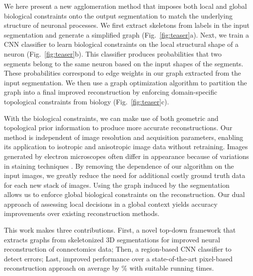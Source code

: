 We here present a new agglomeration method that imposes both local and global biological constraints onto the output segmentation to match the underlying structure of neuronal processes.
We first extract skeletons from labels in the input segmentation and generate a simplified graph (Fig.~\ref{fig:teaser}a). 
Next, we train a CNN classifier to learn biological constraints on the local structural shape of a neuron (Fig.~\ref{fig:teaser}b). 
This classifier produces probabilities that two segments belong to the same neuron based on the input shapes of the segments.
These probabilities correspond to edge weights in our graph extracted from the input segmentation.
We then use a graph optimization algorithm to partition the graph into a final improved reconstruction by enforcing domain-specific topological constraints from biology (Fig.~\ref{fig:teaser}c).

With the biological constraints, we can make use of both geometric and topological prior information to produce more accurate reconstructions.
Our method is independent of image resolution and acquisition parameters, enabling its application to isotropic and anisotropic image data without retraining.
Images generated by electron microscopes often differ in appearance because of variations in staining techniques \cite{briggman2012volume}.
By removing the dependence of our algorithm on the input images, we greatly reduce the need for additional costly ground truth data for each new stack of images.
Using the graph induced by the segmentation allows us to enforce global biological constraints on the reconstruction. 
Our dual approach of assessing local decisions in a global context yields accuracy improvements over existing reconstruction methods.


This work makes three contributions.
First, a novel top-down framework that extracts graphs from skeletonized 3D segmentations for improved neural reconstruction of connectomics data; 
Then, a region-based CNN classifier to detect errors; 
Last, improved performance over a state-of-the-art pixel-based reconstruction approach on average by \% with suitable running times.
